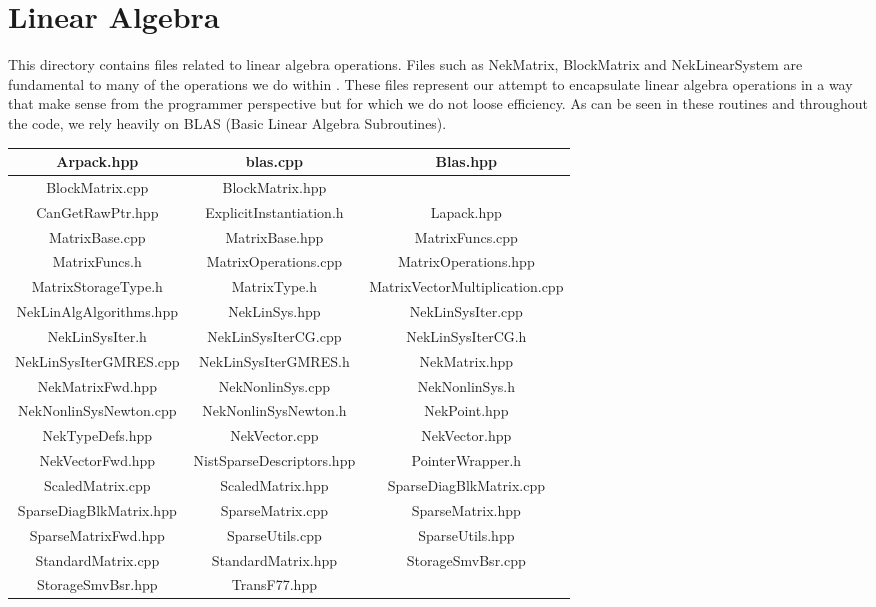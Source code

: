 %
\section{Linear Algebra}

This directory contains files related to linear algebra operations.  Files such as NekMatrix, BlockMatrix and NekLinearSystem are fundamental to many of the operations we do within {\nek}.
These files represent our attempt to encapsulate linear algebra operations in a way that make sense from the programmer perspective but for which we do not loose efficiency.  As can be seen in these
routines and throughout the code, we rely heavily on BLAS (Basic Linear Algebra Subroutines).

\begin{center}
\begin{tabular}{|c | c | c |} \hline
Arpack.hpp &	blas.cpp & Blas.hpp \\ \hline
BlockMatrix.cpp & BlockMatrix.hpp & \\ \hline
CanGetRawPtr.hpp & ExplicitInstantiation.h & Lapack.hpp \\ \hline
MatrixBase.cpp	& MatrixBase.hpp	 & MatrixFuncs.cpp	\\ \hline
MatrixFuncs.h	& MatrixOperations.cpp & MatrixOperations.hpp \\ \hline
MatrixStorageType.h & MatrixType.h & MatrixVectorMultiplication.cpp	\\ \hline
NekLinAlgAlgorithms.hpp	& NekLinSys.hpp	& NekLinSysIter.cpp \\ \hline
NekLinSysIter.h &  NekLinSysIterCG.cpp & NekLinSysIterCG.h \\ \hline
NekLinSysIterGMRES.cpp & NekLinSysIterGMRES.h & NekMatrix.hpp \\ \hline
NekMatrixFwd.hpp & NekNonlinSys.cpp & NekNonlinSys.h \\ \hline
NekNonlinSysNewton.cpp & NekNonlinSysNewton.h & NekPoint.hpp \\ \hline
NekTypeDefs.hpp &  NekVector.cpp & NekVector.hpp \\ \hline
NekVectorFwd.hpp & NistSparseDescriptors.hpp & PointerWrapper.h \\ \hline
ScaledMatrix.cpp & ScaledMatrix.hpp & SparseDiagBlkMatrix.cpp \\ \hline
SparseDiagBlkMatrix.hpp & SparseMatrix.cpp & SparseMatrix.hpp \\ \hline
SparseMatrixFwd.hpp & SparseUtils.cpp & SparseUtils.hpp \\ \hline
StandardMatrix.cpp & StandardMatrix.hpp & StorageSmvBsr.cpp \\ \hline
StorageSmvBsr.hpp & TransF77.hpp & \\ \hline
\end{tabular}
\end{center}

